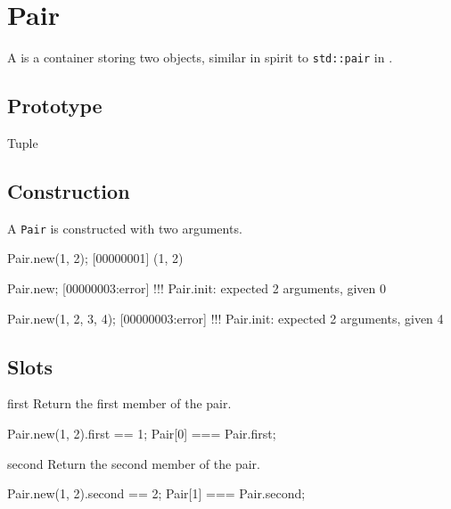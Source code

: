 \section{Pair}

A  is a container storing two objects, similar in spirit to
\lstinline|std::pair| in \Cxx.

\subsection{Prototype}
\begin{refObjects}
\item[Tuple]
\end{refObjects}

\subsection{Construction}

A \lstinline|Pair| is constructed with two arguments.

\begin{urbiscript}[firstnumber=1]
Pair.new(1, 2);
[00000001] (1, 2)

Pair.new;
[00000003:error] !!! Pair.init: expected 2 arguments, given 0

Pair.new(1, 2, 3, 4);
[00000003:error] !!! Pair.init: expected 2 arguments, given 4
\end{urbiscript}

\subsection{Slots}
\begin{urbiscriptapi}
\item[first]
  Return the first member of the pair.
\begin{urbiassert}
Pair.new(1, 2).first == 1;
Pair[0] === Pair.first;
\end{urbiassert}

\item[second]
  Return the second member of the pair.
\begin{urbiassert}
Pair.new(1, 2).second == 2;
Pair[1] === Pair.second;
\end{urbiassert}
\end{urbiscriptapi}



